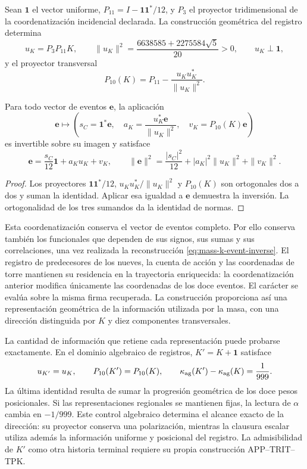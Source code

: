 Sean \(\mathbf1\) el vector uniforme,
\(P_{11}=I-\mathbf1\mathbf1^*/12\), y \(P_3\) el proyector
tridimensional de la coordenatización incidencial declarada. La construcción
geométrica del registro determina
\[
 u_K=P_3P_{11}K,\qquad
 \|u_K\|^2=\frac{6638585+2275584\sqrt5}{20}>0,
 \qquad u_K\perp\mathbf1,
\]
y el proyector transversal
\[
 P_{10}(K)=P_{11}-\frac{u_Ku_K^*}{\|u_K\|^2}.
\]

\begin{proposition}
Para todo vector de eventos \(\mathbf e\), la aplicación
\begin{equation}
 \mathbf e\longmapsto
 \left(s_C=\mathbf1^*\mathbf e,\quad
       a_K=\frac{u_K^*\mathbf e}{\|u_K\|^2},\quad
       v_K=P_{10}(K)\mathbf e\right)
 \label{eq:mass-k-event-chart}
\end{equation}
es invertible sobre su imagen y satisface
\begin{equation}
 \mathbf e=\frac{s_C}{12}\mathbf1+a_Ku_K+v_K,
 \qquad
 \|\mathbf e\|^2=\frac{|s_C|^2}{12}
          +|a_K|^2\|u_K\|^2+\|v_K\|^2.
 \label{eq:mass-k-event-inverse}
\end{equation}
\end{proposition}
\begin{proof}
Los proyectores \(\mathbf1\mathbf1^*/12\),
\(u_Ku_K^*/\|u_K\|^2\) y \(P_{10}(K)\) son ortogonales dos a
dos y suman la identidad. Aplicar esa igualdad a \(\mathbf e\)
demuestra la inversión. La ortogonalidad de los tres sumandos da la
identidad de normas.
\end{proof}

Esta coordenatización conserva el vector de eventos completo. Por ello conserva
también los funcionales que dependen de sus signos, sus sumas y sus
correlaciones, una vez realizada la reconstrucción
\eqref{eq:mass-k-event-inverse}. El registro de predecesores de los nueves,
la cuenta de acción y las coordenadas de torre mantienen su residencia
en la trayectoria enriquecida: la coordenatización anterior modifica únicamente
las coordenadas de los doce eventos. El carácter se evalúa sobre la misma
firma recuperada. La construcción proporciona así una representación
geométrica de la información utilizada por la masa, con una dirección
distinguida por \(K\) y diez componentes transversales.

La cantidad de información que retiene cada representación puede probarse
exactamente. En el dominio algebraico de registros, \(K'=K+\mathbf1\)
satisface
\[
 u_{K'}=u_K,\qquad P_{10}(K')=P_{10}(K),\qquad
 \kappa_{\rm ag}(K')-\kappa_{\rm ag}(K)=\frac1{999}.
\]
La última identidad resulta de sumar la progresión geométrica de los
doce pesos posicionales. Si las representaciones regionales se mantienen
fijas, la lectura de \(\alpha\) cambia en \(-1/999\).
Este control algebraico determina el alcance exacto de la dirección:
su proyector conserva una polarización, mientras la clausura escalar
utiliza además la información uniforme y posicional del registro.
La admisibilidad de \(K'\) como otra historia terminal requiere su
propia construcción APP--TRIT--TPK.

